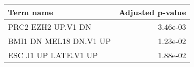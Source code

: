 \begin{tabular}{lr}
\toprule
             Term name &  Adjusted p-value \\
\midrule
    PRC2 EZH2 UP.V1 DN &          3.46e-03 \\
BMI1 DN MEL18 DN.V1 UP &          1.23e-02 \\
  ESC J1 UP LATE.V1 UP &          1.88e-02 \\
\bottomrule
\end{tabular}
